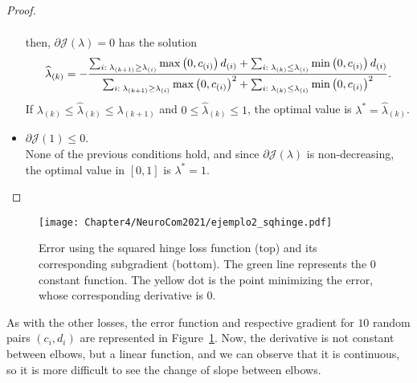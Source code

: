 \begin{proof}
\begin{itemize}
\begin{equation}
\begin{aligned}
            \end{aligned}        
        \end{equation}
        then, $\partial \mathcal{J}(\lambda) = 0$ has the solution
        \begin{equation}
            \nonumber
            \widehat{\lambda}_{(k)} = - \frac{\sum_{i:\; \lambda_{(k+1)} \geq \lambda_{(i)}} \max\left(0, c_{(i)}\right) d_{(i)} + \sum_{i:\; \lambda_{(k)} \leq \lambda_{(i)}} \min\left(0, c_{(i)}\right) d_{(i)}}{\sum_{i:\; \lambda_{(k+1)} \geq \lambda_{(i)}} \max\left(0, c_{(i)}\right)^2 + \sum_{i:\; \lambda_{(k)} \leq \lambda_{(i)}} \min\left(0, c_{(i)}\right)^2} .
        \end{equation}
        If $\lambda_{(k)} \leq \widehat{\lambda}_{(k)} \leq \lambda_{(k+1)}$ and $0 \leq \widehat{\lambda}_{(k)} \leq 1$, the optimal value is $\lambda^* = \widehat{\lambda}_{(k)}$.
        \item $\partial \mathcal{J}(1) \leq 0$. 
        \\None of the previous conditions hold, and since $\partial \mathcal{J}(\lambda)$ is non-decreasing, the optimal value in $[0, 1]$ is $\lambda^* = 1$.
    \end{itemize}
\end{proof}


\begin{figure}[t!]
    \centering
    \texttt{[image: Chapter4/NeuroCom2021/ejemplo2\_sqhinge.pdf]}
    \caption{Error using the squared hinge loss function (top) and its corresponding subgradient (bottom). The green line represents the $0$ constant function. The yellow dot is the point minimizing the error, whose corresponding derivative is $0$.}
    \label{fig:sqhinge_error}
\end{figure}

As with the other losses, the error function and respective gradient for $10$ random pairs $(c_i, d_i)$ are represented in Figure~\ref{fig:sqhinge_error}.
Now, the derivative is not constant between elbows, but a linear function, and we can observe that it is continuous, so it is more difficult to see the change of slope between elbows. 

